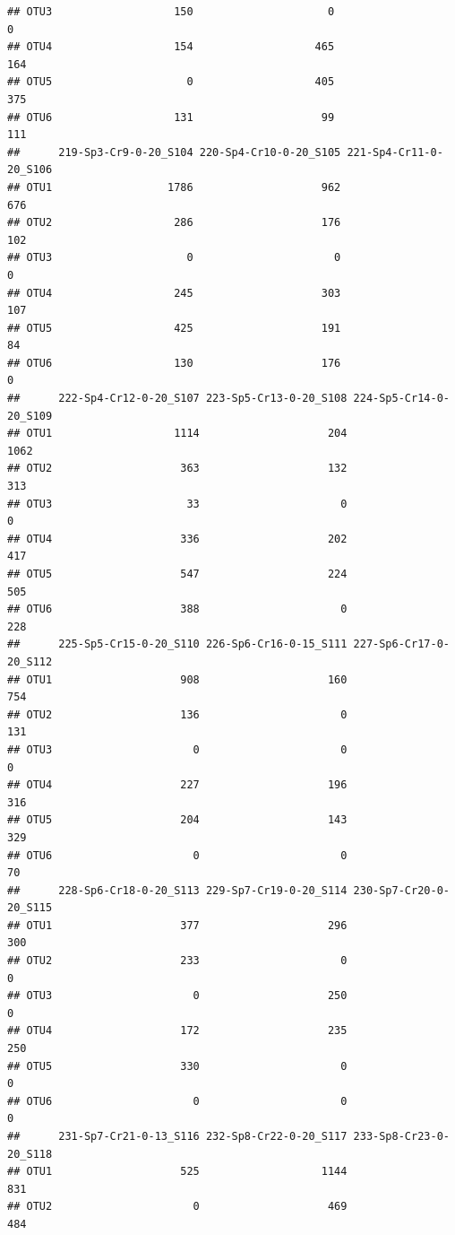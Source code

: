 \documentclass[]{article}
\begin{document}
\begin{verbatim}
## OTU3                   150                     0                     0
## OTU4                   154                   465                   164
## OTU5                     0                   405                   375
## OTU6                   131                    99                   111
##      219-Sp3-Cr9-0-20_S104 220-Sp4-Cr10-0-20_S105 221-Sp4-Cr11-0-20_S106
## OTU1                  1786                    962                    676
## OTU2                   286                    176                    102
## OTU3                     0                      0                      0
## OTU4                   245                    303                    107
## OTU5                   425                    191                     84
## OTU6                   130                    176                      0
##      222-Sp4-Cr12-0-20_S107 223-Sp5-Cr13-0-20_S108 224-Sp5-Cr14-0-20_S109
## OTU1                   1114                    204                   1062
## OTU2                    363                    132                    313
## OTU3                     33                      0                      0
## OTU4                    336                    202                    417
## OTU5                    547                    224                    505
## OTU6                    388                      0                    228
##      225-Sp5-Cr15-0-20_S110 226-Sp6-Cr16-0-15_S111 227-Sp6-Cr17-0-20_S112
## OTU1                    908                    160                    754
## OTU2                    136                      0                    131
## OTU3                      0                      0                      0
## OTU4                    227                    196                    316
## OTU5                    204                    143                    329
## OTU6                      0                      0                     70
##      228-Sp6-Cr18-0-20_S113 229-Sp7-Cr19-0-20_S114 230-Sp7-Cr20-0-20_S115
## OTU1                    377                    296                    300
## OTU2                    233                      0                      0
## OTU3                      0                    250                      0
## OTU4                    172                    235                    250
## OTU5                    330                      0                      0
## OTU6                      0                      0                      0
##      231-Sp7-Cr21-0-13_S116 232-Sp8-Cr22-0-20_S117 233-Sp8-Cr23-0-20_S118
## OTU1                    525                   1144                    831
## OTU2                      0                    469                    484

\end{verbatim}
\end{document}
